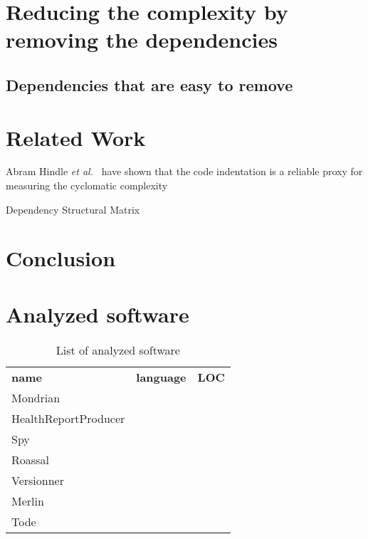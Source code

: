 \documentclass{sig-alternate}
\newcommand{\etal}{\emph{et al.}\xspace}
\newcommand{\seclabel}[1]{\label{sec:#1}}
\begin{document}
\section{Reducing the complexity by removing the dependencies}

\subsection{Dependencies that are easy to remove}

\section{Related Work}

Abram Hindle \etal~\cite{Hind08a} have shown that the code indentation is a reliable proxy for measuring the cyclomatic complexity

Dependency Structural Matrix~\cite{Sang05a}

\section{Conclusion}\seclabel{conclusion}







\appendix

\section{Analyzed software} \seclabel{listOfSoftware}

\begin{table}
\begin{tabular}{|l|l|l|}\hline
\textbf{name} & \textbf{language} & \textbf{LOC}\\
Mondrian\\
HealthReportProducer\\
Spy\\
Roassal\\
Versionner\\
Merlin\\
Tode\\
\end{tabular}
\caption{List of analyzed software}
\end{table}
\end{document}
